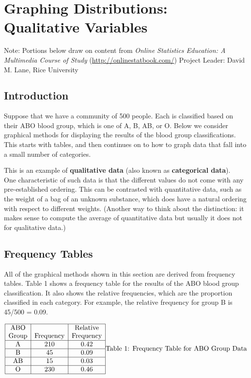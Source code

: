 \documentclass[
]{book}
\begin{document}
\hypertarget{graphing-distributions-qualitative-variables}{%
\chapter{Graphing Distributions: Qualitative Variables}\label{graphing-distributions-qualitative-variables}}

Note: Portions below draw on content from
\emph{Online Statistics Education: A Multimedia Course of Study}
(\url{http://onlinestatbook.com/}) Project Leader: David M. Lane, Rice University

\hypertarget{introduction}{%
\section{Introduction}\label{introduction}}

Suppose that we have a community of 500 people. Each is classified based on
their ABO blood group, which is one of A, B, AB, or O. Below we consider
graphical methods for displaying the results of the blood group classifications.
This starts with tables, and then continues on to how to graph data that
fall into a small number of categories.

This is an example of \textbf{qualitative data} (also known as \textbf{categorical data}).\\
One characteristic of such data is
that the different values do not come with any pre-established ordering.
This can be contrasted with quantitative data, such as the weight of a bag of an
unknown substance, which does have a natural ordering with respect to
different weights. (Another way to think about the distinction: it makes sense
to compute the average of quantitative data but usually it does not for
qualitative data.)

\hypertarget{frequency-tables}{%
\section{Frequency Tables}\label{frequency-tables}}

All of the graphical methods shown in this section are derived from frequency
tables. Table 1 shows a frequency table for the results of the ABO blood group
classification. It also shows the
relative frequencies, which are the proportion classified in each category.
For example, the relative frequency for group B is 45/500 = 0.09.

\[
\begin{array}{|c|c|c|} \hline
\mathrm{ABO} & & \mathrm{Relative} \\
\mathrm{Group} & \mathrm{Frequency} & \mathrm{Frequency} \\ \hline
\mathrm{A} & 210 & 0.42 \\  \hline
\mathrm{B} & 45  & 0.09 \\  \hline
\mathrm{AB} & 15 & 0.03 \\  \hline
\mathrm{O} & 230 & 0.46 \\  \hline
\end{array}\\
\mbox{Table 1: Frequency Table for ABO Group Data}
\]
\end{document}
